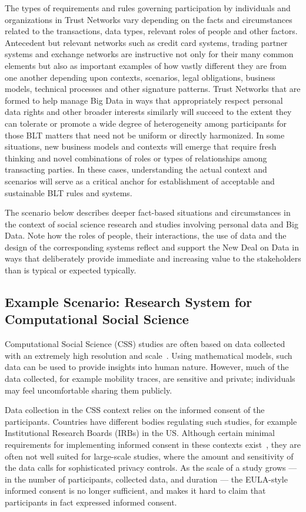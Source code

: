 The types of requirements and rules governing participation by individuals and organizations in Trust Networks vary depending on the facts and circumstances related to the transactions, data types, relevant roles of people and other factors. 
Antecedent but relevant networks such as credit card systems, trading partner systems and exchange networks are instructive not only for their many common elements but also as important examples of how vastly different they are from one another depending upon contexts, scenarios, legal obligations, business models, technical processes and other signature patterns.
Trust Networks that are formed to help manage Big Data in ways that appropriately respect personal data rights and other broader interests similarly will succeed to the extent they can tolerate or promote a wide degree of heterogeneity among participants for those BLT matters that need not be uniform or directly harmonized.
In some situations, new business models and contexts will emerge that require fresh thinking and novel combinations of roles or types of relationships among transacting parties.
In these cases, understanding the actual context and scenarios will serve as a critical anchor for establishment of acceptable and sustainable BLT rules and systems.  


The scenario below describes deeper fact-based situations and circumstances in the context of social science research and studies involving personal data and Big Data.
Note how the roles of people, their interactions, the use of data and the design of the corresponding systems reflect and support the New Deal on Data in ways that deliberately provide immediate and increasing value to the stakeholders than is typical or expected typically.


 \subsection{Example Scenario: Research System for Computational Social Science}

Computational Social Science (CSS) studies are often based on data collected with an extremely high resolution and scale~\cite{lazer2009life}.
Using mathematical models, such data can be used to provide insights into human nature.
However, much of the data collected, for example mobility traces, are sensitive and private; individuals may feel uncomfortable sharing them publicly.

Data collection in the CSS context relies on the informed consent of the participants. 
Countries have different bodies regulating such studies, for example Institutional Research Boards (IRBs) in the US.
Although certain minimal requirements for implementing informed consent in these contexts exist~\cite{IMM2013-06632}, they are often not well suited for large-scale studies, where the amount and sensitivity of the data calls for sophisticated privacy controls.
As the scale of a study grows --- in the number of participants, collected data, and duration --- the EULA-style informed consent is no longer sufficient, and makes it hard to claim that participants in fact expressed informed consent.

